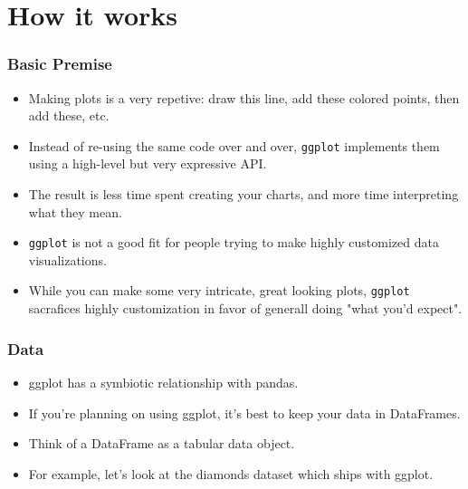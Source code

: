 \documentclass{beamer}
\begin{document}
\section{How it works}
\begin{frame}[fragile]
	\Large
\frametitle{Basic Premise}
\begin{itemize}
\item Making plots is a very repetive: draw this line, add these colored points, then add these, etc. 
\item Instead of re-using the same code over and over, \texttt{ggplot} implements them using a high-level but very expressive API.
\item The result is less time spent creating your charts, and more time interpreting what they mean.
\end{itemize}

\end{frame}
\begin{frame}[fragile]
	\Large
	\begin{itemize}
\item \texttt{ggplot} is not a good fit for people trying to make highly customized data visualizations. 
\item While you can make some very intricate, great looking plots, \texttt{ggplot} sacrafices highly customization in favor of generall doing "what you'd expect".
	\end{itemize}

\end{frame}
\begin{frame}[fragile]
\frametitle{Data}
\Large
\begin{itemize}
\item ggplot has a symbiotic relationship with pandas. 
\item If you're planning on using ggplot, it's best to keep your data in DataFrames. 
\item Think of a DataFrame as a tabular data object. 
\item For example, let's look at the diamonds dataset which ships with ggplot.
\end{itemize}
\end{frame}
\end{document}
